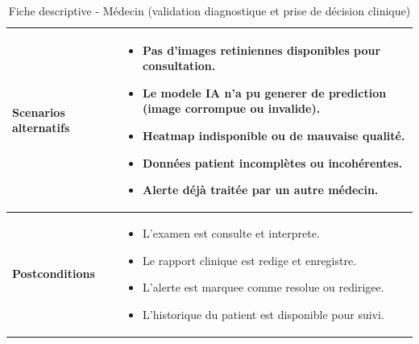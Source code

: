 \begin{table}[H]
\begin{tabular}{|p{5cm}|p{10cm}|}
\textbf{Scenarios alternatifs} &
\begin{itemize}
\item Pas d'images retiniennes disponibles pour consultation.
\item Le modele IA n'a pu generer de prediction (image corrompue ou invalide).
\item Heatmap indisponible ou de mauvaise qualité.
\item Données patient incomplètes ou incohérentes.
\item Alerte déjà traitée par un autre médecin.
\end{itemize} \\ \hline

\textbf{Postconditions} &
\begin{itemize}
\item L'examen est consulte et interprete.
\item Le rapport clinique est redige et enregistre.
\item L'alerte est marquee comme resolue ou redirigee.
\item L'historique du patient est disponible pour suivi.
\end{itemize} \\ \hline
\end{tabular}
\caption{Fiche descriptive - Médecin (validation diagnostique et prise de décision clinique)}
\end{table}

